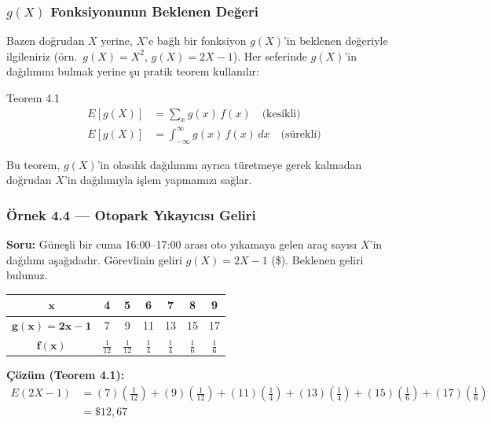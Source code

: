 \documentclass[light]{lutbeamer}
\begin{document}
\begin{frame}[fragile]
  \frametitle[Teorem 4.1]{$g(X)$ Fonksiyonunun Beklenen Değeri}
  Bazen doğrudan $X$ yerine, $X$'e bağlı bir fonksiyon $g(X)$'in beklenen değeriyle ilgileniriz (örn.\ $g(X) = X^2$, $g(X) = 2X-1$). Her seferinde $g(X)$'in dağılımını bulmak yerine şu pratik teorem kullanılır:
  \begin{center}
    \begin{minipage}{0.9\textwidth}
      \begin{block}{Teorem 4.1}
        {\small
        \begin{align*}
          E[g(X)] &= \sum_x g(x)\, f(x) \quad \text{(kesikli)} \\[4pt]
          E[g(X)] &= \int_{-\infty}^{\infty} g(x)\, f(x) \,dx \quad \text{(sürekli)}
        \end{align*}
        }
      \end{block}
    \end{minipage}
  \end{center}
  Bu teorem, $g(X)$'in olasılık dağılımını ayrıca türetmeye gerek kalmadan doğrudan $X$'in dağılımıyla işlem yapmamızı sağlar.
\end{frame}

\begin{frame}[fragile]
  \frametitle[Örnek 4.4]{Örnek 4.4 --- Otopark Yıkayıcısı Geliri}

  \smallskip
  \textbf{Soru:} Güneşli bir cuma 16:00--17:00 arası oto yıkamaya gelen araç sayısı $X$'in dağılımı aşağıdadır. Görevlinin geliri $g(X) = 2X - 1$ (\$). Beklenen geliri bulunuz.

  {\small
  \begin{center}
    \renewcommand{\arraystretch}{1.2}
    \begin{tabular}{ccccccc}
      \toprule
      $\mathbf{x}$ & 4 & 5 & 6 & 7 & 8 & 9 \\
      \midrule
      $\mathbf{g(x)=2x-1}$ & 7 & 9 & 11 & 13 & 15 & 17 \\
      \midrule
      $\mathbf{f(x)}$ & $\frac{1}{12}$ & $\frac{1}{12}$ & $\frac{1}{4}$ & $\frac{1}{4}$ & $\frac{1}{6}$ & $\frac{1}{6}$ \\
      \bottomrule
    \end{tabular}
  \end{center}
  }

  \textbf{Çözüm (Teorem 4.1):}
  {\small
  \begin{align*}
    E(2X\!-\!1) &= (7)\!\left(\tfrac{1}{12}\right) + (9)\!\left(\tfrac{1}{12}\right) + (11)\!\left(\tfrac{1}{4}\right) + (13)\!\left(\tfrac{1}{4}\right) + (15)\!\left(\tfrac{1}{6}\right) + (17)\!\left(\tfrac{1}{6}\right) \\
                &= \$12{,}67
  \end{align*}
  }
\end{frame}
\end{document}

